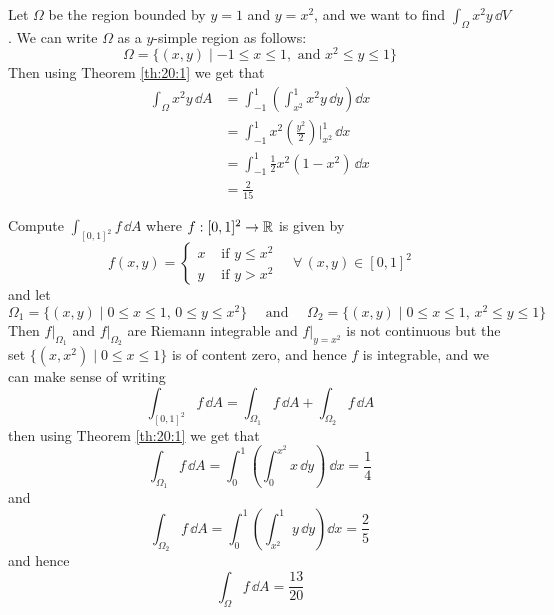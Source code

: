 \documentclass[../Analysis-3]{subfiles}
\begin{document}
\begin{Eg}{}{}
    Let $\Omega$ be the region bounded by $y = 1$ and $y = x^2$, and we want to find $\int_{\Omega} x^2y \, \dd V$. We can write $\Omega$ as a $y$-simple region as follows:
    \[
        \Omega = \{ (x,y) \mid -1 \leq x \leq 1, \mbox{ and } x^2 \leq y \leq 1 \}
    \]
    Then using Theorem \ref{th:20:1} we get that
    \begin{align*}
        \int_{\Omega} x^2y \, \dd A
         & = \int_{-1}^1 \left( \int_{x^2}^1 x^2y \, \dd y\right)\dd x               \\
         & = \int_{-1}^1 x^2 \left( \frac{y^2}{2} \right)\bigg\vert_{x^2}^1 \, \dd x \\
         & = \int_{-1}^1 \frac{1}{2} x^2(1-x^2) \, \dd x                             \\
         & = \frac{2}{15}
    \end{align*}
\end{Eg}

\begin{Eg}{}{}
    Compute $\int_{[0,1]^2} f \, \dd A$ where $f : [0,1]^2 \to \mathbb{R}$ is given by
    \[
        f(x,y) = \begin{cases}
            x & \mbox{ if } y \leq x^2 \\ y & \mbox{ if } y > x^2
        \end{cases} \quad \forall \, (x,y) \in [0,1]^2
    \]
    and let
    \[
        \Omega_1 = \{ (x,y) \mid 0 \leq x \leq 1, \, 0 \leq y \leq x^2 \} \quad \mbox{ and } \quad \Omega_2 = \{ (x,y) \mid 0 \leq x \leq 1, \, x^2 \leq y \leq 1 \}
    \]
    Then $f\vert_{\Omega_1}$ and $f\vert_{\Omega_2}$ are Riemann integrable and $f\vert_{y=x^2}$ is not continuous but the set $\{ (x,x^2) \mid 0 \leq x \leq 1 \}$ is of content zero, and hence $f$ is integrable, and we can make sense of writing
    \[
        \int_{[0,1]^2} f \, \dd A = \int_{\Omega_1} f \, \dd A + \int_{\Omega_2} f \, \dd A
    \]
    then using Theorem \ref{th:20:1} we get that
    \[
        \int_{\Omega_1} f \, \dd A = \int_0^1 \left( \int_0^{x^2} x \, \dd y \right)\ \dd x = \frac{1}{4}
    \]
    and
    \[
        \int_{\Omega_2} f \, \dd A = \int_0^1 \left( \int_{x^2}^1 y \, \dd y\right)\dd x = \frac{2}{5}
    \]
    and hence
    \[
        \int_{\Omega} f \, \dd A = \frac{13}{20}
    \]
\end{Eg}
\end{document}
